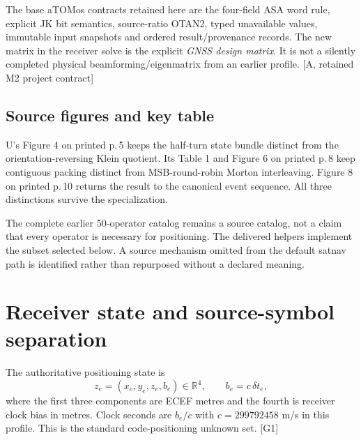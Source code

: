 \documentclass[11pt,a4paper]{article}
\newcommand{\base}{\textcolor{muted}{[A, retained M2 project contract]}}
\newcommand{\ext}[1]{\textcolor{muted}{[#1]}}
\newcommand{\R}{\mathbb R}\newcommand{\N}{\mathbb N}\newcommand{\Z}{\mathbb Z}\newcommand{\B}{\{0,1\}}
\begin{document}
The base aTOMos contracts retained here are the four-field ASA word rule, explicit JK
bit semantics, source-ratio OTAN2, typed unavailable values, immutable input snapshots
and ordered result/provenance records. The new matrix in the receiver solve is the
explicit \emph{GNSS design matrix}. It is not a silently completed physical
beamforming/eigenmatrix from an earlier profile. \base

\subsection{Source figures and key table}
U's Figure 4 on printed p.\,5 keeps the half-turn state bundle distinct from the
orientation-reversing Klein quotient. Its Table 1 and Figure 6 on printed p.\,8 keep
contiguous packing distinct from MSB-round-robin Morton interleaving. Figure 8 on
printed p.\,10 returns the result to the canonical event sequence. All three distinctions
survive the specialization.

The complete earlier 50-operator catalog remains a source catalog, not a claim that
every operator is necessary for positioning. The delivered helpers implement the
subset selected below. A source mechanism omitted from the default satnav path is
identified rather than repurposed without a declared meaning.
\clearpage

\section{Receiver state and source-symbol separation}
The authoritative positioning state is
\begin{equation}
z_e=(x_e,y_e,z_e,b_e)\in\R^4,\qquad b_e=c\,\delta t_e,
\end{equation}
where the first three components are ECEF metres and the fourth is receiver clock
bias in metres. Clock seconds are $b_e/c$ with $c=299792458$ m/s in this profile.
This is the standard code-positioning unknown set. \ext{G1}
\end{document}
